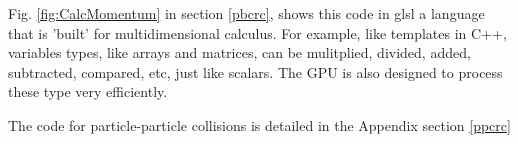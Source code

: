 Fig. \ref{fig:CalcMomentum} in section \ref{pbcrc}, shows this code in glsl a language that is 'built' for multidimensional calculus. For example, like templates in C++, variables types, like arrays and matrices, can be mulitplied, divided, added, subtracted, compared, etc, just like scalars. The GPU is also designed to process these type very efficiently.

The code for particle-particle collisions is detailed in the Appendix section \ref{ppcrc}
